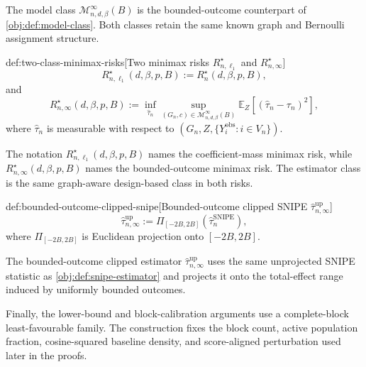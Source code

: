 The model class \(\mathcal M_{n,d,\beta}^{\infty}(B)\) is the bounded-outcome counterpart of \cref{obj:def:model-class}. Both classes retain the same known graph and Bernoulli assignment structure.

\begin{definitionv}{def:two-class-minimax-risks}[Two minimax risks $R_{n,\ell_1}^{\star}$ and $R_{n,\infty}^{\star}$]
\[
R_{n,\ell_1}^{\star}(d,\beta,p,B)
:=
R_n^\star(d,\beta,p,B),
\]
and
\[
R_{n,\infty}^{\star}(d,\beta,p,B)
:=
\inf_{\widehat\tau_n}
\sup_{(G_n,c)\in\mathcal M_{n,d,\beta}^{\infty}(B)}
\mathbb E_Z\!\left[
\left(\widehat\tau_n-\tau_n\right)^2
\right],
\]
where \(\widehat\tau_n\) is measurable with respect to \((G_n,Z,\{Y_i^{\mathrm{obs}}:i\in V_n\})\).
\end{definitionv}

The notation \(R_{n,\ell_1}^{\star}(d,\beta,p,B)\) names the coefficient-mass minimax risk, while \(R_{n,\infty}^{\star}(d,\beta,p,B)\) names the bounded-outcome minimax risk. The estimator class is the same graph-aware design-based class in both risks.

\begin{definitionv}{def:bounded-outcome-clipped-snipe}[Bounded-outcome clipped SNIPE $\widehat\tau_{n,\infty}^{\mathrm{up}}$]
\[
\widehat\tau_{n,\infty}^{\mathrm{up}}
:=
\Pi_{[-2B,2B]}\!\left(\widehat\tau_n^{\mathrm{SNIPE}}\right),
\]
where \(\Pi_{[-2B,2B]}\) is Euclidean projection onto \([-2B,2B]\).
\end{definitionv}

The bounded-outcome clipped estimator \(\widehat\tau_{n,\infty}^{\mathrm{up}}\) uses the same unprojected SNIPE statistic as \cref{obj:def:snipe-estimator} and projects it onto the total-effect range induced by uniformly bounded outcomes.

Finally, the lower-bound and block-calibration arguments use a complete-block least-favourable family. The construction fixes the block count, active population fraction, cosine-squared baseline density, and score-aligned perturbation used later in the proofs.

